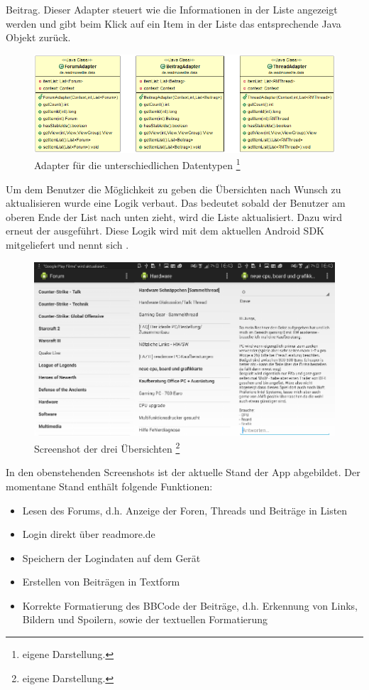 Beitrag. Dieser Adapter steuert wie die Informationen in der Liste angezeigt
werden und gibt beim Klick auf ein Item in der Liste das entsprechende Java
Objekt zurück.
\begin{figure}[!htbp]
\centering
\includegraphics[width=\textwidth]{Bilder/adapter.png}
\caption[Adapter für die unterschiedlichen Datentypen]{Adapter für die unterschiedlichen Datentypen
\protect\footnote{eigene Darstellung.} }
\label{restuml}
\end{figure}
Um dem Benutzer die Möglichkeit zu geben die Übersichten nach Wunsch zu
aktualisieren wurde eine  Logik verbaut. Das bedeutet
sobald der Benutzer am oberen Ende der List nach unten zieht, wird die Liste
aktualisiert. Dazu wird erneut der  ausgeführt. Diese
 Logik wird mit dem aktuellen Android SDK
mitgeliefert und nennt sich . 
\begin{figure}[!htbp]
\centering
\includegraphics[width=\textwidth]{Bilder/screen_gesamt.png}
\caption[Screenshot der drei Übersichten]{Screenshot der drei Übersichten \protect\footnote{eigene Darstellung.} }
\label{restuml}
\end{figure}
In den obenstehenden Screenshots ist der aktuelle Stand der App abgebildet. Der
momentane Stand enthält folgende Funktionen:
\begin{itemize}
  \item Lesen des Forums, d.h. Anzeige der Foren, Threads und Beiträge in Listen
  \item Login direkt über readmore.de
  \item Speichern der Logindaten auf dem Gerät
  \item Erstellen von Beiträgen in Textform
  \item Korrekte Formatierung des BBCode der Beiträge, d.h. Erkennung von Links,
  Bildern und Spoilern, sowie der textuellen Formatierung
\end{itemize}
